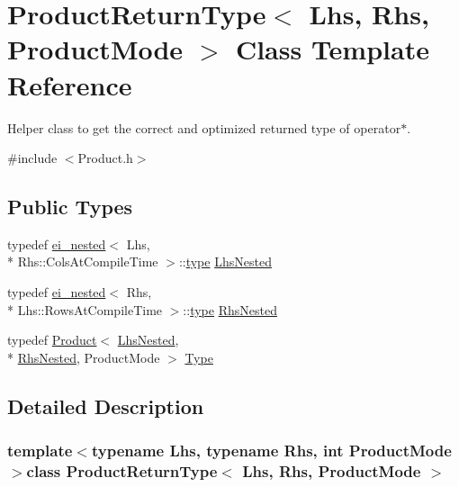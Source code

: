 \hypertarget{struct_product_return_type}{\section{Product\-Return\-Type$<$ Lhs, Rhs, Product\-Mode $>$ Class Template Reference}
\label{struct_product_return_type}
}


Helper class to get the correct and optimized returned type of operator$\ast$.  




{\ttfamily \#include $<$Product.\-h$>$}

\subsection*{Public Types}
\begin{DoxyCompactItemize}
\item 
typedef \hyperlink{structei__nested}{ei\-\_\-nested}$<$ Lhs, \\*
Rhs\-::\-Cols\-At\-Compile\-Time $>$\-::\hyperlink{glext_8h_a7d05960f4f1c1b11f3177dc963a45d86}{type} \hyperlink{struct_product_return_type_a662cb7a04cfa9fe67f1d7056ee010dc8}{Lhs\-Nested}
\item 
typedef \hyperlink{structei__nested}{ei\-\_\-nested}$<$ Rhs, \\*
Lhs\-::\-Rows\-At\-Compile\-Time $>$\-::\hyperlink{glext_8h_a7d05960f4f1c1b11f3177dc963a45d86}{type} \hyperlink{struct_product_return_type_a4a48c2b37c66d1492db14945a01b5338}{Rhs\-Nested}
\item 
typedef \hyperlink{class_product}{Product}$<$ \hyperlink{struct_product_return_type_a662cb7a04cfa9fe67f1d7056ee010dc8}{Lhs\-Nested}, \\*
\hyperlink{struct_product_return_type_a4a48c2b37c66d1492db14945a01b5338}{Rhs\-Nested}, Product\-Mode $>$ \hyperlink{struct_product_return_type_a3a7733c6fd9c465f7fa5d09f53fe35e6}{Type}
\end{DoxyCompactItemize}


\subsection{Detailed Description}
\subsubsection*{template$<$typename Lhs, typename Rhs, int Product\-Mode$>$class Product\-Return\-Type$<$ Lhs, Rhs, Product\-Mode $>$}


